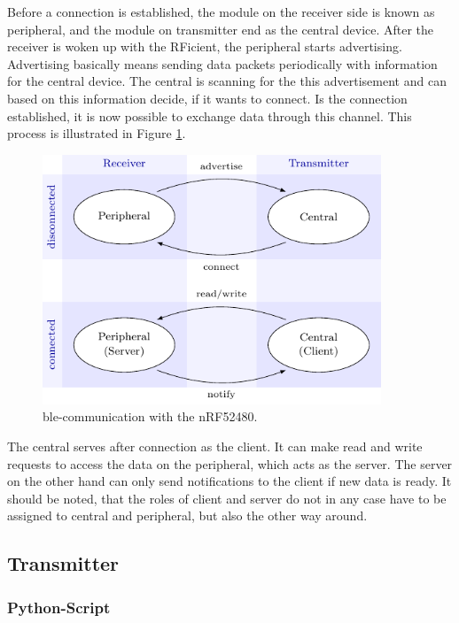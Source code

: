 Before a connection is established, the module on the receiver side is known as peripheral, and the module on transmitter end as the central device.
After the receiver is woken up with the RFicient, the peripheral starts advertising.
Advertising basically means sending data packets periodically with information for the central device.
The central is scanning for the this advertisement and can based on this information decide, if it wants to connect.
Is the connection established, it is now possible to exchange data through this channel.
This process is illustrated in Figure \ref{software:ble}.
\begin{figure}[ht]
	\centering
	\includegraphics[width=0.9\textwidth]{4-development/software/graphics/ble.pdf}
	\caption{\acs{ble}-communication with the nRF52480.\label{software:ble}}
\end{figure}

The central serves after connection as the client.
It can make read and write requests to access the data on the peripheral, which acts as the server.
The server on the other hand can only send notifications to the client if new data is ready.
It should be noted, that the roles of client and server do not in any case have to be assigned to central and peripheral, but also the other way around. 

\subsection{Transmitter}

\subsubsection{Python-Script}
\lstset{basicstyle=\footnotesize}
\lstset{style=mystyle}

